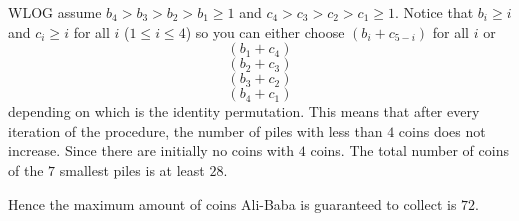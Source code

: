 \documentclass{article}
\begin{document}
\begin{enumerate}
WLOG assume $b_4 > b_3 > b_2 > b_1 \ge 1$ and $c_4 > c_3 > c_2 > c_1 \ge 1$. Notice that $b_i \ge i$ and $c_i \ge i$ for all $i$ ($1 \le i \le 4$) so you can either choose $(b_i + c_{5-i} )$ for all $i$ or
$$(b_1 + c_4 )$$
$$(b_2 + c_3 )$$
$$(b_3 + c_2 )$$
$$(b_4 + c_1 )$$
depending on which is the identity permutation. This means that after every iteration of the procedure, the number of piles with less than $4$ coins does not increase. Since there are initially no coins with $4$ coins. The total number of coins of the $7$ smallest piles is at least $28$.

Hence the maximum amount of coins Ali-Baba is guaranteed to collect is $72$.
\end{enumerate}
\end{document}
